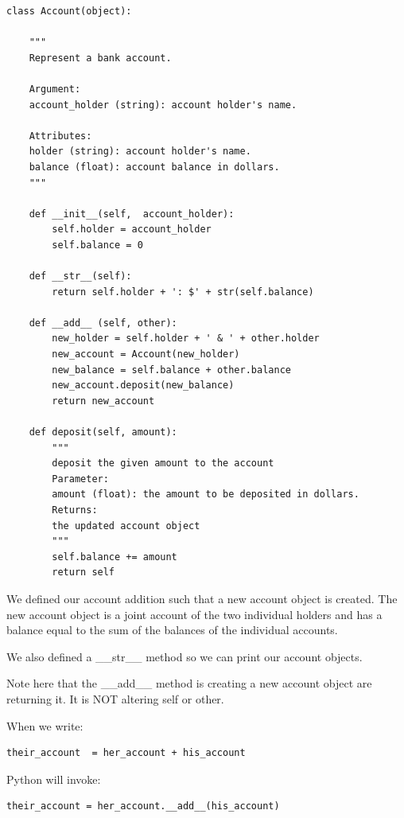 \documentclass{article}
\begin{document}
\begin{lstlisting}
class Account(object):
 
    """
    Represent a bank account.
 
    Argument:
    account_holder (string): account holder's name.
 
    Attributes:
    holder (string): account holder's name.
    balance (float): account balance in dollars.
    """
 
    def __init__(self,  account_holder):
        self.holder = account_holder
        self.balance = 0
 
    def __str__(self):
        return self.holder + ': $' + str(self.balance)
 
    def __add__ (self, other):
        new_holder = self.holder + ' & ' + other.holder
        new_account = Account(new_holder)
        new_balance = self.balance + other.balance
        new_account.deposit(new_balance)
        return new_account
 
    def deposit(self, amount):
        """
        deposit the given amount to the account
        Parameter:
        amount (float): the amount to be deposited in dollars.
        Returns:
        the updated account object
        """
        self.balance += amount
        return self
\end{lstlisting}

We defined our account addition such that a new account object is created.  The new account object is a joint account of the two individual holders and has a balance equal to the sum of the balances of the individual accounts.  

We also defined a {\_}{\_}str{\_}{\_} method so we can print our account objects.

Note here that the {\_}{\_}add{\_}{\_} method is creating a new account object are returning it.  It is NOT altering self or other.

When we write:

\begin{lstlisting}
their_account  = her_account + his_account
\end{lstlisting}

Python will invoke:
\begin{lstlisting}
their_account = her_account.__add__(his_account) 
\end{lstlisting}
 
\end{document}
